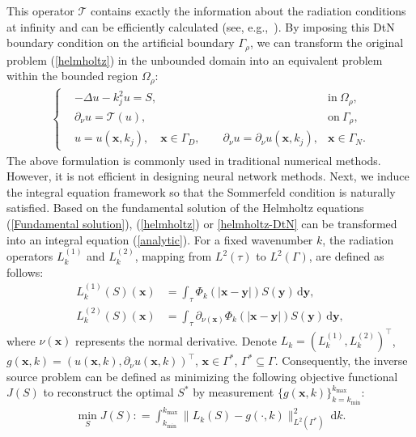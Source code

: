\documentclass{article}
\theoremstyle{plain}
\theoremstyle{definition}
\begin{document}
This operator $\mathcal{T}$ contains exactly the information about the radiation conditions at infinity and can be efficiently calculated (see, e.g.,~\cite{ShenWang2007AnalysisSpectralGalerkin}). By imposing this DtN boundary condition on the artificial boundary $\Gamma_{\rho}$, we can transform the original problem (\ref{helmholtz}) in the unbounded domain into an equivalent problem within the bounded region $\Omega_{\rho}$:
\begin{align}\label{helmholtz-DtN}
\left \{
\begin{aligned}
&-\Delta u-k_{j}^2u=S,  &\text{in} \  \Omega_\rho, \\
& \partial_{\nu} u = \mathcal{T}(u), & \text{on} \ \Gamma_{\rho},\\
& u=u(\boldsymbol{x},k_j), \quad \boldsymbol{x}\in\Gamma_D, \qquad \partial_{\nu} u=\partial_{\nu}u(\boldsymbol{x},k_j), &\boldsymbol{x}\in\Gamma_N.
\end{aligned}
\right.
\end{align}
The above formulation is commonly used in traditional numerical methods. However, it is not efficient in designing neural network methods.
Next, we induce the integral equation framework so that the Sommerfeld condition is naturally satisfied. Based on the fundamental solution of the Helmholtz equations (\ref{Fundamental solution}),  (\ref{helmholtz}) or \eqref{helmholtz-DtN} can be transformed into an integral equation (\ref{analytic}). For a fixed wavenumber $k$,  the radiation operators \( L_k^{(1)} \) and \( L_k^{(2)} \),  mapping from \( L^2(\tau) \) to \( L^2(\Gamma) \),  are defined as follows: 
\begin{align}\label{L1}
L_k^{(1)}(S)(\boldsymbol{x}) &= \int_{\tau} \Phi_k(|\boldsymbol{x} - \boldsymbol{y}|) S(\boldsymbol{y}) \,  \mathrm{d}\boldsymbol{y},  \\
\label{L2}
L_k^{(2)}(S)(\boldsymbol{x}) &= \int_{\tau} {\partial_{\nu(\boldsymbol{x})} \Phi_k(|\boldsymbol{x} -\boldsymbol{y}|)} S(\boldsymbol{y}) \,  \mathrm{d}\boldsymbol{y},  %
\end{align}
where \( \nu(\boldsymbol{x}) \) represents the normal derivative. 
Denote $L_k=(L_k^{(1)}, L_k^{(2)})^\top$,  $g(\boldsymbol{x}, k)=(u(\boldsymbol{x}, k), \partial_{\nu}u(\boldsymbol{x}, k))^\top$,  $\boldsymbol{x} \in \Gamma^*$,  $\Gamma^*\subseteq\Gamma$. Consequently, the inverse source problem can be defined as minimizing the following  objective functional $J(S)$ to reconstruct the optimal $S^*$ by measurement $\{g(\boldsymbol{x},k)\}_{k=k_{\text{min}}}^{k_{\text{max}}}$: 
\begin{align}
    \label{continue_ISP}
    \min_{S} J(S) : = \int_{k_{\text{min}}}^{k_{\text{max}}} \| L_k(S) - g(\cdot,  k) \|_{L^2(\Gamma^*)}^2 \ \mathrm{d}k.
\end{align}
\end{document}
